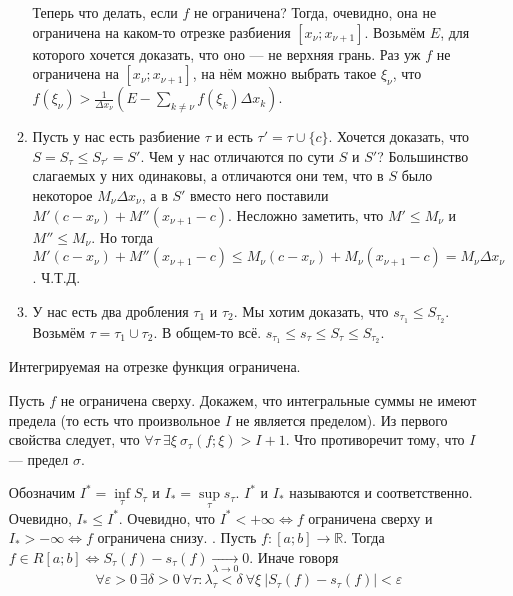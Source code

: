 \documentclass{article}
\begin{document}
\begin{itemize}
\begin{Proof}
\begin{enumerate}
                Теперь что делать, если $f$ не ограничена? Тогда, очевидно, она не ограничена на каком-то отрезке разбиения $[x_\nu;x_{\nu+1}]$. Возьмём $E$, для которого хочется доказать, что оно --- не верхняя грань. Раз уж $f$ не ограничена на $[x_\nu;x_{\nu+1}]$, на нём можно выбрать такое $\xi_\nu$, что $f(\xi_\nu)>\frac1{\Delta x_\nu}(E-\sum\limits_{k\neq\nu}f(\xi_k)\Delta x_k)$.
                \item
                Пусть у нас есть разбиение $\tau$ и есть $\tau'=\tau\cup\{c\}$. Хочется доказать, что $S=S_\tau\leqslant S_{\tau'}=S'$. Чем у нас отличаются по сути $S$ и $S'$? Большинство слагаемых у них одинаковы, а отличаются они тем, что в $S$ было некоторое $M_\nu\Delta x_\nu$, а в $S'$ вместо него поставили $M'(c-x_\nu)+M''(x_{\nu+1}-c)$. Несложно заметить, что $M'\leqslant M_\nu$ и $M''\leqslant M_\nu$. Но тогда $M'(c-x_\nu)+M''(x_{\nu+1}-c)\leqslant M_\nu(c-x_\nu)+M_\nu(x_{\nu+1}-c)=M_\nu\Delta x_\nu$. Ч.Т.Д.
                \item У нас есть два дробления $\tau_1$ и $\tau_2$. Мы хотим доказать, что $s_{\tau_1}\leqslant S_{\tau_2}$. Возьмём $\tau=\tau_1\cup\tau_2$. В общем-то всё. $s_{\tau_1}\leqslant s_\tau\leqslant S_\tau\leqslant S_{\tau_2}$.
            \end{enumerate}
        \end{Proof}
        \thm Интегрируемая на отрезке функция ограничена.
        \begin{Proof}
            Пусть $f$ не ограничена сверху. Докажем, что интегральные суммы не имеют предела (то есть что произвольное $I$ не является пределом). Из первого свойства следует, что $\forall\tau~\exists\xi~\sigma_\tau(f;\xi)>I+1$. Что противоречит тому, что $I$ --- предел $\sigma$.
        \end{Proof}
        \dfn Обозначим $I^*=\inf\limits_\tau S_\tau$ и $I_*=\sup\limits_\tau s_\tau$. $I^*$ и $I_*$ называются  и  соответственно.
        \thm Очевидно, $I_*\leqslant I^*$.
        \thm Очевидно, что $I^*<+\infty\Leftrightarrow f\text{ ограничена сверху}$ и $I_*>-\infty\Leftrightarrow f\text{ ограничена снизу}$.
        \thm {}. Пусть $f\colon[a;b]\to\mathbb R$. Тогда $f\in R[a;b]\Leftrightarrow S_\tau(f)-s_\tau(f)\underset{\lambda\to0}\longrightarrow0$. Иначе говоря
        $$\forall\varepsilon>0~\exists\delta>0~\forall\tau:\lambda_\tau<\delta~\forall\xi~|S_\tau(f)-s_\tau(f)|<\varepsilon$$
        \begin{Proof}

\end{Proof}
\end{itemize}
\end{document}
